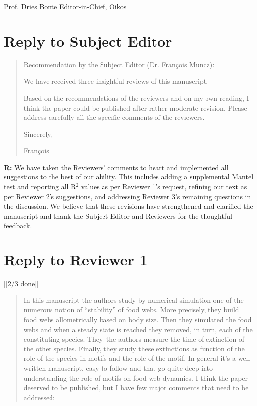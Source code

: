 \documentclass[12pt]{article}
\begin{document}
  Prof. Dries Bonte
  Editor-in-Chief, Oikos


\clearpage

\section*{Reply to Subject Editor}

  \begin{quotation}
    Recommendation by the Subject Editor (Dr. Fran\c{c}ois Munoz):

    We have received three insightful reviews of this manuscript.

    Based on the recommendations of the reviewers and on my own reading, I think the paper could be published after rather moderate revision. Please address carefully all the specific comments of the reviewers.

    Sincerely,

    Fran\c{c}ois
  \end{quotation}

  
  \textbf{R:} We have taken the Reviewers' comments to heart and implemented all suggestions to the best of our ability. This includes adding a supplemental Mantel test and reporting all R$^2$ values as per Reviewer 1's request, refining our text as per Reviewer 2's suggestions, and addressing Reviewer 3's remaining questions in the discussion. We believe that these revisions have strengthened and clarified the manuscript and thank the Subject Editor and Reviewers for the thoughtful feedback.


\clearpage

\section*{Reply to Reviewer 1} [[2/3 done]]

  \begin{quotation}

    In this manuscript the authors study by numerical simulation one of the numerous notion of ``stability'' of food webs. More precisely, they build food webs allometrically based on body size. Then they simulated the food webs and when a steady state is reached they removed, in turn, each of the constituting species. They, the authors measure the time of extinction of the other species. Finally, they study these extinctions as function of the role of the species in motifs and the role of the motif. In general it’s a well-written manuscript, easy to follow and that go quite deep into understanding the role of motifs on food-web dynamics. I think the paper deserved to be published, but I have few major comments that need to be addressed:

  \end{quotation}
\end{document}
